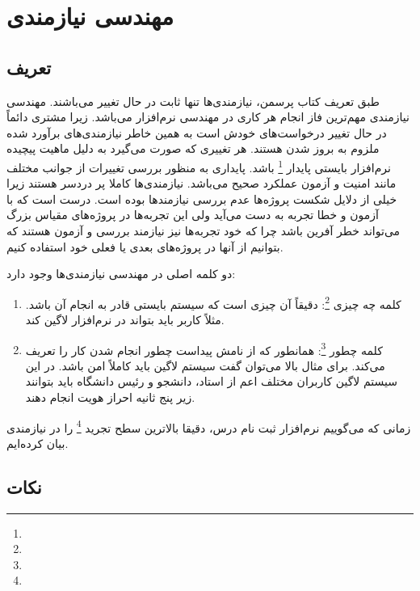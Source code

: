 \section{مهندسی نیازمندی}

\subsection{تعریف}

طبق تعریف کتاب پرسمن، نیازمندی‌ها تنها ثابت در حال تغییر می‌باشند. مهندسی
نیازمندی مهم‌ترین فاز انجام هر کاری در مهندسی نرم‌افزار می‌باشد. زیرا مشتری
دائماً در حال تغییر درخواست‌های خودش است به همین خاطر نیازمندی‌های برآورد شده
ملزوم به بروز شدن هستند. هر تغییری که صورت می‌گیرد به دلیل ماهیت پیچیده
نرم‌افزار بایستی پایدار \footnote{} باشد. پایداری به منظور بررسی
تغییرات از جوانب مختلف مانند امنیت و آزمون عملکرد صحیح می‌باشد. نیازمندی‌ها
کاملا پر دردسر هستند زیرا خیلی از دلایل شکست پروژه‌ها عدم بررسی نیازمند‌ها بوده
است. درست است که با آزمون و خطا تجربه به دست می‌آید ولی این تجربه‌ها در
پروژه‌های مقیاس بزرگ می‌تواند خطر آفرین باشد چرا که خود تجربه‌ها نیز نیازمند
بررسی و آزمون هستند که بتوانیم از آنها در پروژه‌های بعدی یا فعلی خود استفاده
کنیم.

دو کلمه اصلی در مهندسی نیازمندی‌ها وجود دارد:

\begin{enumerate}
  \item کلمه چه چیزی \footnote{}: دقیقاً‌ آن چیزی است که سیستم بایستی
  قادر به انجام آن باشد. مثلاً کاربر باید بتواند در نرم‌افزار لاگین کند.
  \item کلمه چطور \footnote{}: همانطور که از نامش پیداست چطور انجام شدن
  کار را تعریف می‌کند. برای مثال بالا می‌توان گفت سیستم لاگین باید کاملاً امن
  باشد. در این سیستم لاگین کاربران مختلف اعم از استاد، دانشجو و رئیس دانشگاه
  باید بتوانند زیر پنج ثانیه احراز هویت انجام دهند.
\end{enumerate}

زمانی که می‌گوییم نرم‌افزار ثبت نام درس، دقیقا بالاترین سطح تجرید
\footnote{} را در نیازمندی بیان کرده‌ایم.

\subsection*{نکات}

